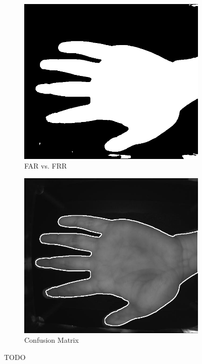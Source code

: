 \begin{enumerate}
    \begin{figure}[!ht]
        \centering
        \begin{subfigure}[t]{0.48\columnwidth}
            \includegraphics[width=\textwidth]{./images/preprocessing/thresholded_image.png}
            \caption{FAR vs. FRR}
            \label{fig:far_vs_frr}
        \end{subfigure}
        \hfill
        \begin{subfigure}[t]{0.48\columnwidth}
            \includegraphics[width=\textwidth]{./images/preprocessing/contour_image.png}
            \caption{Confusion Matrix}
            \label{fig:confusion_matrix}
        \end{subfigure}
        \caption{TODO}
        \label{fig:far_frr_confusion}
    \end{figure}


\end{enumerate}
